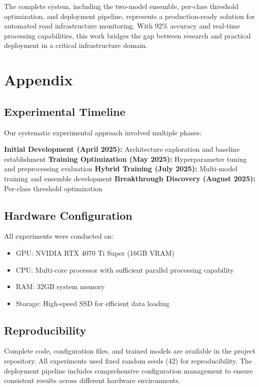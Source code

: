 \documentclass[12pt,twocolumn]{article}
\begin{document}
The complete system, including the two-model ensemble, per-class threshold optimization, and deployment pipeline, represents a production-ready solution for automated road infrastructure monitoring. With 92\% accuracy and real-time processing capabilities, this work bridges the gap between research and practical deployment in a critical infrastructure domain.

\clearpage

\onecolumn



\twocolumn
\section{Appendix}

\subsection{Experimental Timeline}

Our systematic experimental approach involved multiple phases:

\textbf{Initial Development (April 2025):} Architecture exploration and baseline establishment
\textbf{Training Optimization (May 2025):} Hyperparameter tuning and preprocessing evaluation
\textbf{Hybrid Training (July 2025):} Multi-model training and ensemble development
\textbf{Breakthrough Discovery (August 2025):} Per-class threshold optimization

\subsection{Hardware Configuration}

All experiments were conducted on:
\begin{itemize}[itemsep=1pt,parsep=0pt,topsep=3pt]
\item GPU: NVIDIA RTX 4070 Ti Super (16GB VRAM)
\item CPU: Multi-core processor with sufficient parallel processing capability
\item RAM: 32GB system memory
\item Storage: High-speed SSD for efficient data loading
\end{itemize}

\subsection{Reproducibility}

Complete code, configuration files, and trained models are available in the project repository. All experiments used fixed random seeds (42) for reproducibility. The deployment pipeline includes comprehensive configuration management to ensure consistent results across different hardware environments.
\end{document}
